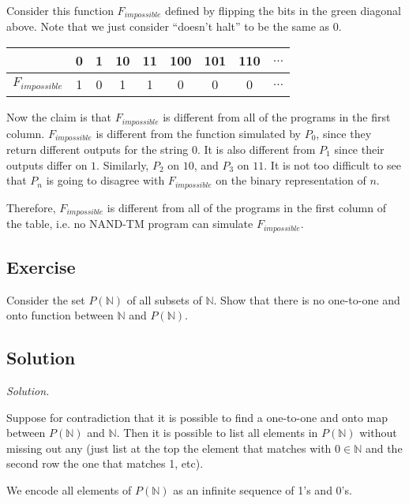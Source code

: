 \documentclass[11pt]{article}
\theoremstyle{definition}
\theoremstyle{remark}
\begin{document}
Consider this function $F_{impossible}$ defined by flipping the bits in the green diagonal above.
Note that we just consider ``doesn't halt'' to be the same as 0.

\begin{center}
    \begin{tabular}{c|cccccccc}
        & 0 & 1 & 10 & 11 & 100 & 101 & 110 & $\dots$ \\ 
        \hline
        $F_{impossible}$ & \cellcolor{green!20}1 & \cellcolor{green!20}0 & \cellcolor{green!20}1 & \cellcolor{green!20}1
        &\cellcolor{green!20}0 & \cellcolor{green!20}0 & \cellcolor{green!20}0 & $\dots$
    \end{tabular}
\end{center}

Now the claim is that $F_{impossible}$ is different from all of the programs in the first column. $F_{impossible}$ is different from
the function simulated by
$P_0$, since they return different outputs for the string $0$. It is also different from $P_1$ since their outputs differ on $1$. 
Similarly, $P_2$ on $10$, and $P_3$ on $11$. It is not too difficult to see that $P_n$ is going to disagree with $F_{impossible}$ on the
binary representation of $n$.

Therefore, $F_{impossible}$ is different from all of the programs in the first column of the table, i.e.
no NAND-TM program can simulate $F_{impossible}$.

\subsection{Exercise}
Consider the set $P(\mathbb{N})$ of all subsets of $\mathbb{N}$. Show that there is no one-to-one and onto function between 
$\mathbb{N}$ and $P(\mathbb{N})$. 

\subsection{Solution}

\emph{Solution.} 

Suppose for contradiction that it is possible to find a one-to-one and onto map between $P(\mathbb{N})$ and $\mathbb{N}$. 
Then it is possible to list all elements in $P(\mathbb{N})$ without missing out any (just list at the top the element that
matches with $0 \in \mathbb{N}$ and the second row the one that matches 1, etc).

We encode all elements of $P(\mathbb{N})$ as an infinite sequence of 1's and 0's.
\end{document}

